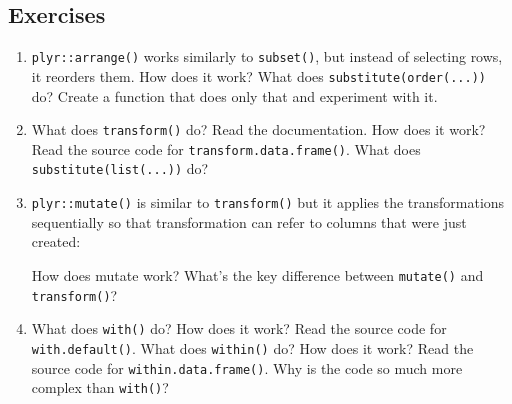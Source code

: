 \subsection{Exercises}

\begin{enumerate}
\def\labelenumi{\arabic{enumi}.}
\item
  \texttt{plyr::arrange()} works similarly to \texttt{subset()}, but
  instead of selecting rows, it reorders them. How does it work? What
  does \texttt{substitute(order(...))} do? Create a function that does
  only that and experiment with it.
\item
  What does \texttt{transform()} do? Read the documentation. How does it
  work? Read the source code for \texttt{transform.data.frame()}. What
  does \texttt{substitute(list(...))} do?
\item
  \texttt{plyr::mutate()} is similar to \texttt{transform()} but it
  applies the transformations sequentially so that transformation can
  refer to columns that were just created:

\begin{Shaded}
\begin{Highlighting}[]
\StringTok{ }\NormalTok{(} \NormalTok{:}\NormalTok{)}
 \StringTok{ } \StringTok{ }
 \StringTok{ } \StringTok{ }
\end{Highlighting}
\end{Shaded}

  How does mutate work? What's the key difference between
  \texttt{mutate()} and \texttt{transform()}?
\item
  What does \texttt{with()} do? How does it work? Read the source code
  for \texttt{with.default()}. What does \texttt{within()} do? How does
  it work? Read the source code for \texttt{within.data.frame()}. Why is
  the code so much more complex than \texttt{with()}?
\end{enumerate}


